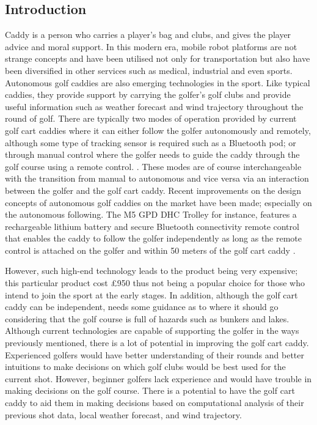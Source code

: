 \documentclass[11pt,landscape]{article}
\begin{document}

\newpage
\begin{multicols}{2}
\tableofcontents
\newpage
\section{Introduction}
Caddy is a person who carries a player's bag and clubs, and gives the player advice
and moral support. In this modern era, mobile robot platforms are not strange concepts
and have been utilised not only for transportation but also have been diversified in
other services such as medical, industrial and even sports. Autonomous golf
caddies are also emerging technologies in the sport. Like typical caddies, they provide
support by carrying the golfer's golf clubs and provide useful information such as
weather forecast and wind trajectory throughout the round of golf. There are typically
two modes of operation provided by current golf cart caddies where it can either
follow the golfer autonomously and remotely, although some type of tracking sensor
is required such as a Bluetooth pod; or through manual control where the
golfer needs to guide the caddy through the golf course using a remote control.
\cite{choi_2020}. These modes are of course interchangeable with the transition
from manual to autonomous and vice versa via an interaction between the
golfer and the golf cart caddy. Recent improvements on the design concepts of
autonomous golf caddies on the market have been made; especially on the autonomous
following. The M5 GPD DHC Trolley for instance, features a rechargeable lithium
battery and secure Bluetooth connectivity remote control that enables the caddy
to follow the golfer independently as long as the remote control is attached on
the golfer and within 50 meters of the golf cart caddy \cite{golf_2022}.

However, such high-end technology leads to the product being very expensive;
this particular product cost £950 thus not being a popular choice for those
who intend to join the sport at the early stages. In addition, although the
golf cart caddy can be independent, needs some guidance as to where it should
go considering that the golf course is full of hazards such as bunkers and lakes.
Although current technologies are capable of supporting the golfer in the ways
previously mentioned, there is a lot of potential in improving the golf cart caddy.
Experienced golfers would have better understanding of their rounds and better
intuitions to make decisions on which golf clubs would be best used for the
current shot. However, beginner golfers lack experience and would have trouble
in making decisions on the golf course. There is a potential to have the golf
cart caddy to aid them in making decisions based on computational analysis
of their previous shot data, local weather forecast, and wind trajectory. 


\end{multicols}
\end{document}
